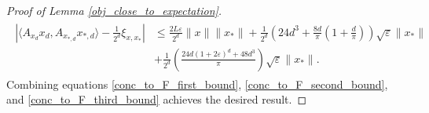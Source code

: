 \documentclass[11pt]{article}
\renewcommand{\epsilon}{\varepsilon}
\renewcommand{\top}{{\mathrm{T}}}
\theoremstyle{remark}
\begin{document}
\begin{proof}[Proof of Lemma \ref{obj_close_to_expectation}]
\begin{align}
\begin{split}
\left| \langle A_{x_d}x_d, A_{x_{*,d}}x_{*,d}\rangle - \frac{1}{2^d}\xi_{x,x_*}\right| %
& \leqslant \frac{2L\epsilon}{2^d}\|x\|\|x_*\| + \frac{1}{2^d} \left(24 d^3 + \frac{8d}{\pi}\left( 1+ \frac{d}{\pi}\right)\right)\sqrt{\epsilon}\|x_*\| \label{conc_to_F_third_bound}\\
& + \frac{1}{2^d}\left(\frac{24d(1 + 2\epsilon)^d + 48d^3}{\pi}\right)\sqrt{\epsilon}\|x_*\|. 
\end{split}
\end{align} Combining equations \eqref{conc_to_F_first_bound}, \eqref{conc_to_F_second_bound}, and \eqref{conc_to_F_third_bound} achieves the desired result.

\end{proof}
\end{document}

